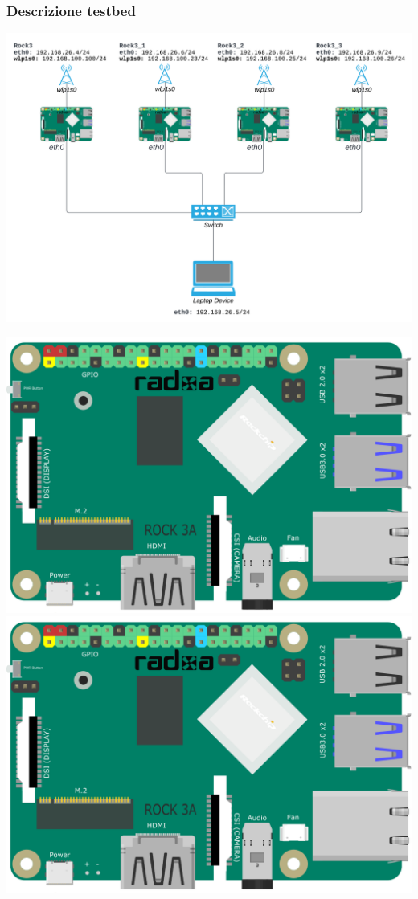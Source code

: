 \documentclass{beamer}
\begin{document}
\begin{frame}
    \frametitle{Descrizione testbed}
    \centering
    \begin{minipage}{0.6\textwidth}
        \includegraphics[width=\textwidth]{topology.png}
    \end{minipage}
    \hfill
    \begin{minipage}{0.35\textwidth}
        \centering
        \includegraphics[width=\textwidth]{ROCK_3A.png}
        \vspace{0.5cm}
        \includegraphics[width=\textwidth]{ROCK_3A.png}

\end{minipage}
\end{frame}
\end{document}
